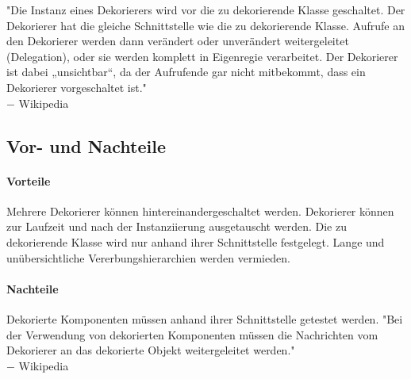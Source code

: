 \documentclass{school}
\begin{document}
"Die Instanz eines Dekorierers wird vor die zu dekorierende Klasse geschaltet. Der Dekorierer hat die gleiche Schnittstelle wie die zu dekorierende Klasse. Aufrufe an den Dekorierer werden dann verändert oder unverändert weitergeleitet (Delegation), oder sie werden komplett in Eigenregie verarbeitet. Der Dekorierer ist dabei „unsichtbar“, da der Aufrufende gar nicht mitbekommt, dass ein Dekorierer vorgeschaltet ist."\\ $-$ Wikipedia \cite{wiki-dekorierer}

\subsection{Vor- und Nachteile}
\paragraph{Vorteile}

\begin{outline}
\1 Mehrere Dekorierer können hintereinandergeschaltet werden. 
\1 Dekorierer können zur Laufzeit und nach der Instanziierung ausgetauscht werden.
\1 Die zu dekorierende Klasse wird nur anhand ihrer Schnittstelle festgelegt.
\1 Lange und unübersichtliche Vererbungshierarchien werden vermieden.
\end{outline}

\paragraph{Nachteile}
\begin{outline}
\1 Dekorierte Komponenten müssen anhand ihrer Schnittstelle getestet werden.
\1 "Bei der Verwendung von dekorierten Komponenten müssen die Nachrichten vom Dekorierer an das dekorierte Objekt weitergeleitet werden."\\ $-$ Wikipedia \cite{wiki-dekorierer}
\end{outline}

\newpage
\end{document}
